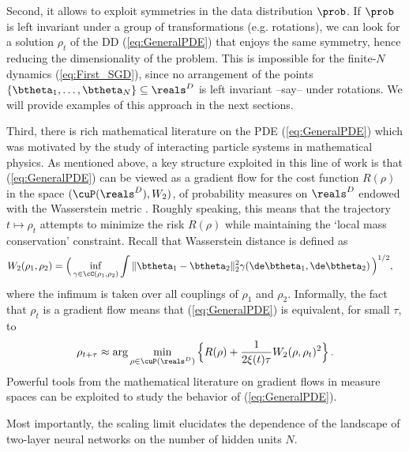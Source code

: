 \documentclass[11pt]{article}
\renewcommand{\eqref}[1]{(\ref{#1})}
\begin{document}
Second, it allows to exploit symmetries in the data distribution $\prob$. If $\prob$ is left invariant under a group of transformations (e.g. rotations), we can look for
a solution  $\rho_t$ of the DD \eqref{eq:GeneralPDE} that enjoys the same symmetry, hence reducing the dimensionality of the problem. This is impossible 
for the finite-$N$ dynamics \eqref{eq:First_SGD}, since no arrangement of the points $\{\btheta_1,\dots, \btheta_N\}\subseteq \reals^D$
 is left invariant --say-- under rotations. 
We will provide examples of this approach in the next sections.

Third, there is rich mathematical literature on the PDE \eqref{eq:GeneralPDE} which was
motivated by the study of interacting particle systems in mathematical physics. As mentioned above, a key structure 
exploited in this line of work is that \eqref{eq:GeneralPDE} can be viewed as a gradient flow for the cost function $R(\rho)$ in the space 
$(\cuP(\reals^D),W_2)$, of probability measures on $\reals^D$
endowed with the Wasserstein metric \cite{jordan1998variational,ambrosio2008gradient,carrillo2003kinetic}. Roughly speaking,
this means that the trajectory $t\mapsto \rho_t$ attempts to minimize the risk $R(\rho)$ while maintaining the `local mass conservation' constraint. 
Recall that Wasserstein distance is defined as
%
\begin{align}
%
W_2(\rho_1,\rho_2) & = \Big(\inf_{\gamma\in \cC(\rho_1,\rho_2)}  \int \|\btheta_1-\btheta_2 \|_2^2 \gamma(\de \btheta_1,\de\btheta_2) \,\Big)^{1/2} , \label{eq:Wasserstein_dual}
%
\end{align}
%
where the infimum is taken over all couplings of $\rho_1$ and $\rho_2$. 
Informally, the fact that $\rho_t$ is a gradient flow means that \eqref{eq:GeneralPDE} is equivalent, for small $\tau$,
to
%
\begin{align}
%
\rho_{t+\tau} \approx \arg\min_{\rho\in \cuP(\reals^D)} \Big\{ R(\rho) +\frac{1}{2\xi(t)\tau}W_2(\rho,\rho_t)^2\Big\}\, .
%
\end{align}
%
Powerful tools from the mathematical
literature on gradient flows in measure spaces \cite{ambrosio2008gradient} can be exploited to study the behavior of \eqref{eq:GeneralPDE}. 

Most importantly, the scaling limit elucidates the dependence of 
the landscape of two-layer neural networks on the number of hidden units $N$. 
\end{document}
